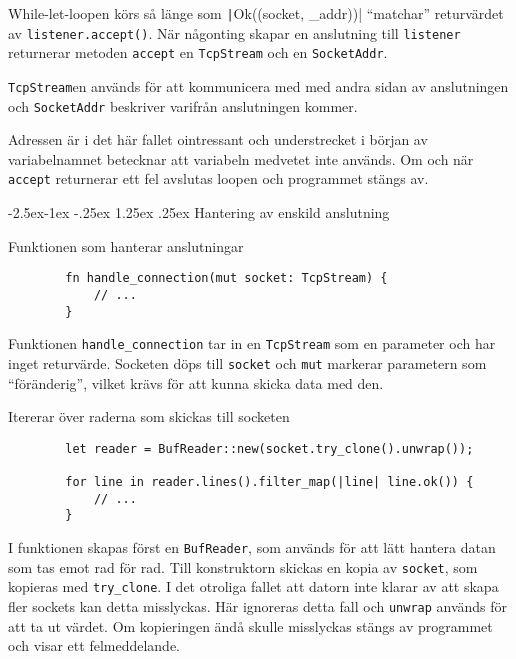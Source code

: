\documentclass{article}
\makeatletter
\renewcommand\paragraph{\@startsection{paragraph}{4}{\z@}%
			{-2.5ex\@plus -1ex \@minus -.25ex}%
			{1.25ex \@plus .25ex}%
			{\normalfont\normalsize\bfseries}}
\makeatother
\begin{document}
While-let-loopen körs så länge som \texttt|Ok((socket, _addr))|
``matchar'' returvärdet av \texttt{listener.accept()}. När någonting skapar en
anslutning till \texttt{listener} returnerar metoden \texttt{accept} en
\texttt{TcpStream} och en \texttt{SocketAddr}.

\texttt{TcpStream}en används för att kommunicera med med andra sidan av
anslutningen och \texttt{SocketAddr} beskriver varifrån anslutningen kommer.

Adressen är i det här fallet ointressant och understrecket i början av
variabelnamnet betecknar att variabeln medvetet inte används. Om och när
\texttt{accept} returnerar ett fel avslutas loopen och programmet stängs av.

\paragraph{Hantering av enskild anslutning}

\begin{listing}[H]
	\caption{Funktionen som hanterar anslutningar}
	\begin{verbatim}
		fn handle_connection(mut socket: TcpStream) {
			// ...
		}
	\end{verbatim}
\end{listing}

Funktionen \texttt{handle\_connection} tar in en \texttt{TcpStream} som en
parameter och har inget returvärde. Socketen döps till \texttt{socket} och
\texttt{mut} markerar parametern som ``föränderig'', vilket krävs för att kunna
skicka data med den.

\begin{listing}[H]
	\caption{Itererar över raderna som skickas till socketen}
	\begin{verbatim}
		let reader = BufReader::new(socket.try_clone().unwrap());

		for line in reader.lines().filter_map(|line| line.ok()) {
			// ...
		}
	\end{verbatim}
\end{listing}

I funktionen skapas först en \texttt{BufReader}, som används för att lätt
hantera datan som tas emot rad för rad. Till konstruktorn skickas en kopia av
\texttt{socket}, som kopieras med \texttt{try\_clone}. I det otroliga fallet att
datorn inte klarar av att skapa fler sockets kan detta misslyckas. Här ignoreras
detta fall och \texttt{unwrap} används för att ta ut värdet. Om kopieringen ändå
skulle misslyckas stängs av programmet och visar ett felmeddelande.
\end{document}
